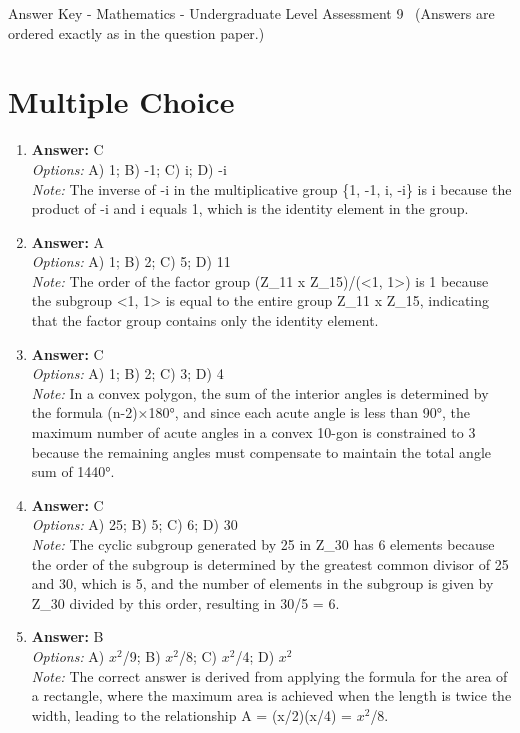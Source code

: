 \documentclass[12pt]{article}
\begin{document}
\begin{center}
Answer Key - Mathematics - Undergraduate Level Assessment 9 \
\small (Answers are ordered exactly as in the question paper.)
\end{center}

\section*{Multiple Choice}
\begin{enumerate}[label=\arabic*.]
\item \textbf{Answer:} C
\\ \textit{Options:} A) 1; B) -1; C) i; D) -i
\\ \textit{Note:} The inverse of -i in the multiplicative group \{1, -1, i, -i\} is i because the product of -i and i equals 1, which is the identity element in the group.
\item \textbf{Answer:} A
\\ \textit{Options:} A) 1; B) 2; C) 5; D) 11
\\ \textit{Note:} The order of the factor group (Z\_11 x Z\_15)/(\textless{}1, 1\textgreater{}) is 1 because the subgroup \textless{}1, 1\textgreater{} is equal to the entire group Z\_11 x Z\_15, indicating that the factor group contains only the identity element.
\item \textbf{Answer:} C
\\ \textit{Options:} A) 1; B) 2; C) 3; D) 4
\\ \textit{Note:} In a convex polygon, the sum of the interior angles is determined by the formula (n-2)×180°, and since each acute angle is less than 90°, the maximum number of acute angles in a convex 10-gon is constrained to 3 because the remaining angles must compensate to maintain the total angle sum of 1440°.
\item \textbf{Answer:} C
\\ \textit{Options:} A) 25; B) 5; C) 6; D) 30
\\ \textit{Note:} The cyclic subgroup generated by 25 in Z\_30 has 6 elements because the order of the subgroup is determined by the greatest common divisor of 25 and 30, which is 5, and the number of elements in the subgroup is given by Z\_30 divided by this order, resulting in 30/5 = 6.
\item \textbf{Answer:} B
\\ \textit{Options:} A) $x^2$/9; B) $x^2$/8; C) $x^2$/4; D) $x^2$
\\ \textit{Note:} The correct answer is derived from applying the formula for the area of a rectangle, where the maximum area is achieved when the length is twice the width, leading to the relationship A = (x/2)(x/4) = $x^2$/8.
\end{enumerate}
\end{document}
